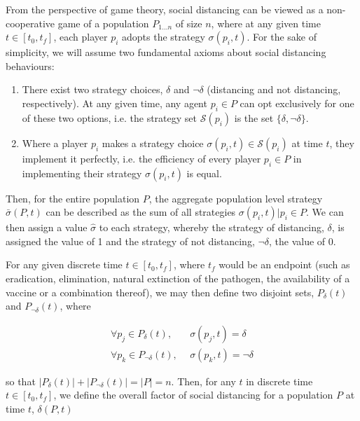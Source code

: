 \documentclass[12pt]{article}
\begin{document}
From the perspective of game theory, social distancing can be viewed as a non-cooperative game of a population $P_{1 \ldots n}$ of size $n$, where at any given time $t \in [t_0, t_f]$, each player $p_i$ adopts the strategy $\sigma(p_i, t)$. For the sake of simplicity, we will assume two fundamental axioms about social distancing behaviours:

\begin{enumerate}
	\item There exist two strategy choices, $\delta$ and $\lnot \delta$ (distancing and not distancing, respectively). At any given time, any agent $p_i \in P$ can opt exclusively for one of these two options, i.e. the strategy set $\mathcal{S}(p_i)$ is the set $\{\delta, \lnot \delta\}$.
	\item Where a player $p_i$ makes a strategy choice $\sigma(p_i, t) \in \mathcal{S}(p_i)$ at time $t$, they implement it perfectly, i.e. the efficiency of every player $p_i \in P$ in implementing their strategy $\sigma(p_i, t)$ is equal.
\end{enumerate}

Then, for the entire population $P$, the aggregate population level strategy $\bar{\sigma}(P, t)$ can be described as the sum of all strategies $\sigma(p_i, t) | p_i \in P$. We can then assign a value $\hat{\sigma}$ to each strategy, whereby the strategy of distancing, $\delta$, is assigned the value of 1 and the strategy of not distancing, $\lnot \delta$, the value of 0. 

For any given discrete time $t \in [t_0, t_f]$, where $t_f$ would be an endpoint (such as eradication, elimination, natural extinction of the pathogen, the availability of a vaccine or a combination thereof), we may then define two disjoint sets, $P_{\delta}(t)$ and $P_{\lnot \delta} (t)$, where 

\begin{equation}
	\begin{aligned}
		\forall p_j \in P_{\delta}(t), & \ \ \sigma(p_j, t) = \delta						\\
		\forall p_k \in P_{\lnot \delta}(t), & \ \ \sigma(p_k, t) = \lnot \delta		
	\end{aligned}
\end{equation}

\noindent so that $|P_{\delta}(t)| + |P_{\lnot \delta}(t)| = |P| = n$. Then, for any $t$ in discrete time $t \in [t_0, t_f]$, we define the overall factor of social distancing for a population $P$ at time $t$, $\delta(P, t)$
\end{document}

